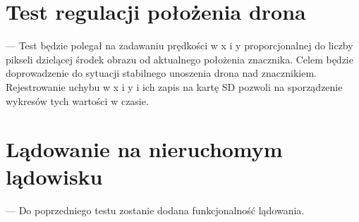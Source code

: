 \section{Test regulacji położenia drona}
\label{sec:test_regulacji_polozenia_drona}
--- Test będzie polegał na zadawaniu prędkości w x i y proporcjonalnej do liczby pikseli dzielącej środek obrazu od aktualnego położenia znacznika. Celem będzie doprowadzenie do sytuacji stabilnego unoszenia drona nad znacznikiem. Rejestrowanie uchybu w x i y i ich zapis na kartę SD pozwoli na sporządzenie wykresów tych wartości w czasie.
\section{Lądowanie na nieruchomym lądowisku}
\label{sec:ladowanie_na_nieruchomym_ladowisku}
--- Do poprzedniego testu zostanie dodana funkcjonalność lądowania.
